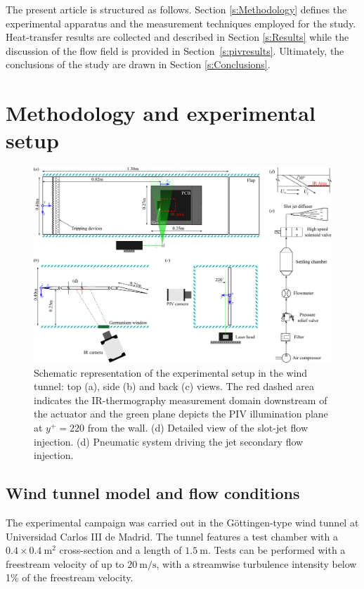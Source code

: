 The present article is structured as follows. Section \ref{s:Methodology} defines the experimental apparatus and the measurement techniques employed for the study. Heat-transfer results are collected and described in Section \ref{s:Results} while the discussion of the flow field is provided in Section~\ref{s:pivresults}. Ultimately, the conclusions of the study are drawn in Section \ref{s:Conclusions}.

\section{Methodology and experimental setup \label{s:Methodology}}

\begin{figure}[t]
    \centering
    \includegraphics[width = 0.99\linewidth]{figures/F1.pdf}
    \caption{Schematic representation of the experimental setup in the wind tunnel: top (a), side (b) and back (c) views. The red dashed area  indicates the IR-thermography measurement domain downstream of the actuator and the green plane  depicts the PIV illumination plane at $y^+=220$ from the wall. (d) Detailed view of the slot-jet flow injection. (d) Pneumatic system driving the jet secondary flow injection.}
    \label{fig:SetUp}
\end{figure}

\subsection{Wind tunnel model and flow conditions \label{ss:WTandBLcond}}
%
The experimental campaign was carried out in the G\"ottingen-type wind tunnel at Universidad Carlos III de Madrid. The tunnel features a test chamber with a $0.4 \times 0.4~\mathrm{m}^2$ cross-section and a length of $1.5~\mathrm{m}$. Tests can be performed with a freestream velocity of up to $20~\mathrm{m/s}$, with a streamwise turbulence intensity below 1\% of the freestream velocity.

